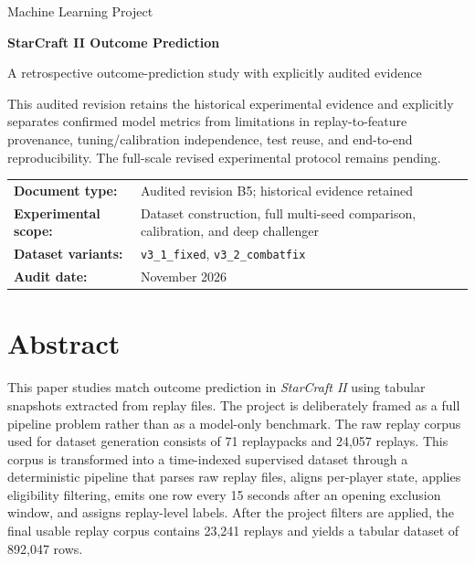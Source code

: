 \documentclass[11pt,a4paper]{article}
\begin{document}
\begin{titlepage}
\centering
\vspace*{1.9cm}
{\Large Machine Learning Project\par}
\vspace{0.45cm}
{\Huge\bfseries StarCraft II Outcome Prediction\par}
\vspace{0.3cm}
{\Large A retrospective outcome-prediction study with explicitly audited evidence\par}
\vspace{1.1cm}
\begin{tcolorbox}[width=0.92\textwidth,colback=softblue,colframe=accent,arc=2mm,boxrule=0.8pt]
This audited revision retains the historical experimental evidence and explicitly separates confirmed model metrics from limitations in replay-to-feature provenance, tuning/calibration independence, test reuse, and end-to-end reproducibility. The full-scale revised experimental protocol remains pending.
\end{tcolorbox}
\vfill
\small
\begin{tabularx}{0.90\textwidth}{@{}>{\raggedleft\arraybackslash}p{} Y@{}}
\textbf{Document type:} & Audited revision B5; historical evidence retained \\
\textbf{Experimental scope:} & Dataset construction, full multi-seed comparison, calibration, and deep challenger \\
\textbf{Dataset variants:} & \texttt{v3\_1\_fixed}, \texttt{v3\_2\_combatfix} \\
\textbf{Audit date:} & November 2026 \\
\end{tabularx}
\normalsize
\vfill
\end{titlepage}

\section*{Abstract}
This paper studies match outcome prediction in \emph{StarCraft II} using tabular snapshots extracted from replay files. The project is deliberately framed as a full pipeline problem rather than as a model-only benchmark. The raw replay corpus used for dataset generation consists of 71 replaypacks and 24,057 replays. This corpus is transformed into a time-indexed supervised dataset through a deterministic pipeline that parses raw replay files, aligns per-player state, applies eligibility filtering, emits one row every 15 seconds after an opening exclusion window, and assigns replay-level labels. After the project filters are applied, the final usable replay corpus contains 23,241 replays and yields a tabular dataset of 892,047 rows.
\end{document}
